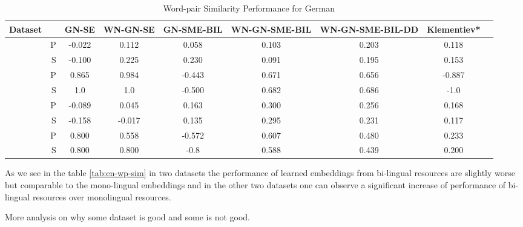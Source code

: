 \begin{table*}[ht]
\caption{Word-pair Similarity Performance for German } %
\label{tbl:de-wp-sim}
\centering  %
\tabcolsep=0.09cm

\begin{tabular}{cr c c c c c c c} %
\hline\hline %
 Dataset & & GN-SE  & WN-GN-SE & GN-SME-BIL &  WN-GN-SME-BIL & WN-GN-SME-BIL-DD & Klementiev*
\\ [0.5ex] 
\hline %
                                 &  P & -0.022  & 0.112 & 0.058 & 0.103&0.203 &0.118 \\[-1ex]
\raisebox{1.5ex}{wortpaare222}  &  S & -0.100 & 0.225 & 0.230 & 0.091 & 0.195 &0.153 \\[1ex]

                                  &  P & 0.865 & 0.984 & -0.443 & 0.671 & 0.656 & -0.887 \\[-1ex]
\raisebox{1.5ex}{wortpaare30}    &  S & 1.0 & 1.0 & -0.500 & 0.682 & 0.686 & -1.0 \\[1ex]

                                  &  P & -0.089  & 0.045 & 0.163 & 0.300& 0.256 &0.168 \\[-1ex]
\raisebox{1.5ex}{wortpaare350}  &  S & -0.158 & -0.017  &  0.135 & 0.295 & 0.231 &0.117 \\[1ex]

                                &  P & 0.800  & 0.558 & -0.572 & 0.607 & 0.480 & 0.233 \\[-1ex]
\raisebox{1.5ex}{wortpaare65}  &  S & 0.800 & 0.800 & -0.8 & 0.588 & 0.439 &0.200 \\[1ex]


\hline %
     
          
\hline %
\end{tabular}


\end{table*}      
          
            
As we see in the table \ref{tab:en-wp-sim} in two datasets the performance of learned embeddings from bi-lingual resources
are slightly worse but comparable to the mono-lingual embeddings and in the other two datasets one can observe a significant 
increase of performance of bi-lingual resources over monolingual resources.      


More analysis on why some dataset is good and some is not good. 